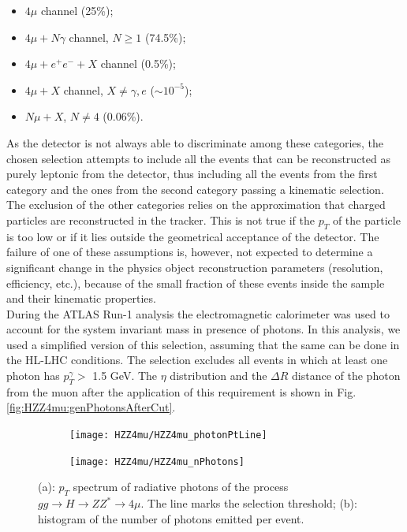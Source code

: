 \documentclass[a4paper,twoside,12pt]{book}
\begin{document}
\begin{itemize}
\item $4\mu$ channel (25\%);
\item $4\mu + N\gamma$ channel, $N \geq 1$ (74.5\%);
\item $4\mu + e^+e^- + X$ channel (0.5\%);
\item $4\mu + X$ channel, $X \neq \gamma, e$ ($\sim 10^{-5}$);
\item $N\mu + X$, $N \neq 4$ (0.06\%).
\end{itemize}

As the detector is not always able to discriminate among these categories, the chosen selection attempts to include all the events that can be reconstructed as purely leptonic from
the detector, thus including all the events
from the first category and the ones from the second category passing a kinematic 
selection. The exclusion of the other categories relies on the approximation that charged
particles are reconstructed in the tracker. This is not true if the $p_{T}$ of the particle is 
too low or if it lies outside the geometrical acceptance of the detector. The failure of one 
of these assumptions is, however, not expected to determine a significant change in the
physics object reconstruction parameters (resolution, efficiency, etc.), because of the
small fraction of these events inside the sample and their kinematic properties. \\

During the ATLAS Run-1 analysis the electromagnetic calorimeter was used to account for the system invariant mass in presence of photons\cite{HZZ4mu_run1}. In
this analysis, we used a simplified version of this selection, assuming that the same
can be done in the HL-LHC conditions. The selection excludes all events in which at least one photon has $p_{T}^{\gamma} >$ 1.5 GeV. The $\eta$ distribution
and the $\Delta R$ distance of the photon from the muon after the application
of this requirement is shown in Fig.\ref{fig:HZZ4mu:genPhotonsAfterCut}.\\

\begin{figure}
\centering
\begin{subfigure}{.5\textwidth}
  \centering
  \texttt{[image: HZZ4mu/HZZ4mu\_photonPtLine]}
  \caption{}
  \label{fig:HZZ4mu:photonPt}
\end{subfigure}%
\begin{subfigure}{.5\textwidth}
  \centering
  \texttt{[image: HZZ4mu/HZZ4mu\_nPhotons]}
  \caption{}
  \label{fig:HZZ4mu:nPhotons}
\end{subfigure}
\caption{(a): $p_T$ spectrum of radiative photons of the process \\
 \mbox{$gg \rightarrow H \rightarrow ZZ^* \rightarrow 4\mu$}. The line
 marks the selection threshold; 
	(b): histogram of the number of photons emitted per event.}
\label{fig:HZZ4mu:genPhotons}
\end{figure}
\end{document}
